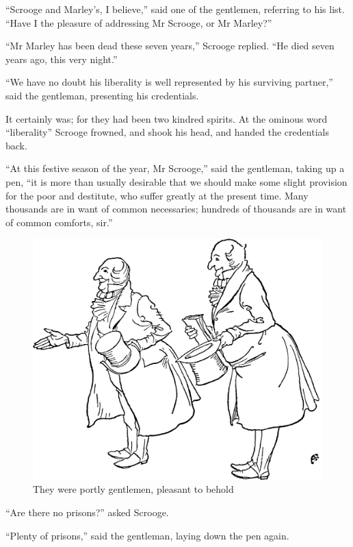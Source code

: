 \documentclass[paper=5.5in:8.5in,BCOR=7mm,twoside,DIV=calc,12pt,usegeometry]{scrbook} %
\begin{document}
\enquote{Scrooge and Marley's, I believe,} said one of the gentlemen, referring to his list. \enquote{Have I the pleasure of addressing Mr Scrooge, or Mr Marley?}

\enquote{Mr Marley has been dead these seven years,} Scrooge replied. \enquote{He died seven years ago, this very night.}

\enquote{We have no doubt his liberality is well represented by his surviving partner,} said the gentleman, presenting his credentials.

It certainly was; for they had been two kindred spirits. At the ominous word \enquote{liberality} Scrooge frowned, and shook his head, and handed the credentials back.

\enquote{At this festive season of the year, Mr Scrooge,} said the gentleman, taking up a pen, \enquote{it is more than usually desirable that we should make some slight provision for the poor and destitute, who suffer greatly at the present time. Many thousands are in want of common necessaries; hundreds of thousands are in want of common comforts, sir.}

\begin{figure}[tbh]
\centering
  \includegraphics[width=\linewidth]{portly}
  \caption*{They were portly gentlemen, pleasant to behold}
\end{figure}

\enquote{Are there no prisons?} asked Scrooge.

\enquote{Plenty of prisons,} said the gentleman, laying down the pen again.
\end{document}
